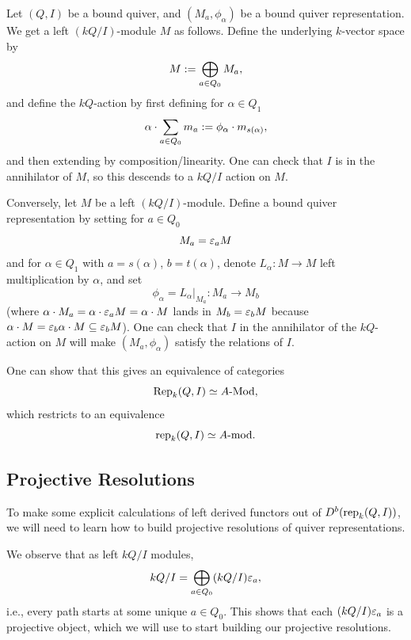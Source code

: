 \documentclass[12pt]{article}
\begin{document}
\begin{construction}
    Let $(Q,I)$ be a bound quiver, and $(M_a,\phi_\alpha)$ be a bound quiver representation. We get a left $(kQ/I)$-module $M$ as follows. Define the underlying $k$-vector space by
    \[M := \bigoplus_{a\in Q_0} M_a,\]
    and define the $kQ$-action by first defining for $\alpha\in Q_1$
    \[\alpha\cdot \sum_{a\in Q_0 }m_a \defeq \phi_\alpha \cdot m_{s(\alpha)},\]
    and then extending by composition/linearity. One can check that $I$ is in the annihilator of $M$, so this descends to a $kQ/I$ action on $M$.

    Conversely, let $M$ be a left $(kQ/I)$-module. Define a bound quiver representation by setting for $a\in Q_0$
    \[M_a = \varepsilon_a M\]
    and for $\alpha \in Q_1$ with $a=s(\alpha)$, $b=t(\alpha)$, denote $L_\alpha: M\to M$ left multiplication by $\alpha$, and set
    \[\phi_\alpha = L_\alpha|_{M_a} : M_a \to M_b\]
    (where $\alpha\cdot M_a = \alpha \cdot \varepsilon_a M = \alpha\cdot M$ lands in $M_b = \varepsilon_b M$ because $\alpha\cdot M = \varepsilon_b \alpha\cdot M \subseteq \varepsilon_b M$). One can check that $I$ in the annihilator of the $kQ$-action on $M$ will make $(M_a,\phi_\alpha)$ satisfy the relations of $I$.

    One can show that this gives an equivalence of categories
    \[\mathrm{Rep}_k(Q,I) \simeq A\text{-}\mathrm{Mod},\]
    which restricts to an equivalence
    \[\mathrm{rep}_k(Q,I) \simeq A\text{-}\mathrm{mod}.\]
\end{construction}


\subsection{Projective Resolutions}

To make some explicit calculations of left derived functors out of $D^b(\mathrm{rep}_k(Q,I))$, we will need to learn how to build projective resolutions of quiver representations.

We observe that as left $kQ/I$ modules,
\[kQ/I = \bigoplus_{a\in Q_0} (kQ/I)\varepsilon_a,\]
i.e., every path starts at some unique $a\in Q_0$. This shows that each $(kQ/I)\varepsilon_a$ is a projective object, which we will use to start building our projective resolutions.
\end{document}
